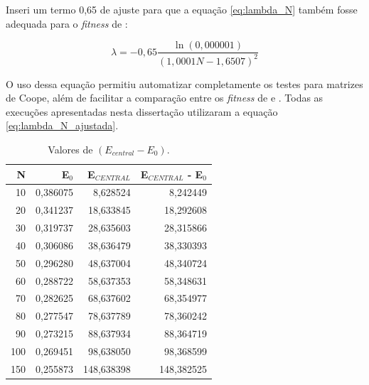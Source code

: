 	
	Inseri um termo 0,65 de ajuste para que a equação \ref{eq:lambda_N} também fosse adequada para o \emph{fitness} de \cite{metodo2004}:
	
	\begin{equation}\label{eq:lambda_N_ajustada}
		\lambda = - 0,65 \frac{\ln(0,000001)}{(1,0001N - 1,6507)^2}
	\end{equation}
	
	O uso dessa equação permitiu automatizar completamente os testes para matrizes de Coope, além de facilitar a comparação entre os \emph{fitness} de \cite{metodo2004} e \cite{metodo2011}. Todas as execuções apresentadas nesta dissertação utilizaram a equação \ref{eq:lambda_N_ajustada}.
	
\begin{table}[htbp]
	\centering
	\caption{Valores de $(E_{central} - E_0)$.}
	\label{tab:ValoresDeECentralE02}
\begin{tabular}{rrrr}
\hline
         \textbf{N} & \textbf{E$_{0}$} &   \textbf{E$_{CENTRAL}$} & \textbf{E$_{CENTRAL}$} - \textbf{E$_{0}$} \\
\hline
        10 &   0,386075 &   8,628524 &   8,242449 \\

        20 &   0,341237 &  18,633845 &  18,292608 \\

        30 &   0,319737 &  28,635603 &  28,315866 \\

        40 &   0,306086 &  38,636479 &  38,330393 \\

        50 &   0,296280 &  48,637004 &  48,340724 \\

        60 &   0,288722 &  58,637353 &  58,348631 \\

        70 &   0,282625 &  68,637602 &  68,354977 \\

        80 &   0,277547 &  78,637789 &  78,360242 \\

        90 &   0,273215 &  88,637934 &  88,364719 \\

       100 &   0,269451 &  98,638050 &  98,368599 \\

       150 &   0,255873 & 148,638398 & 148,382525 \\


\end{tabular}
\end{table}
